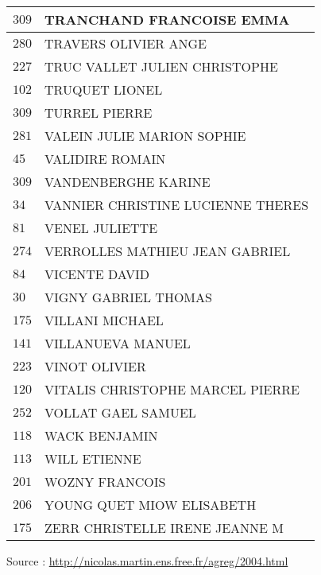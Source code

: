 \begin{xltabular}{\linewidth}{|l|X|}
    \hline
    $309$ & TRANCHAND FRANCOISE EMMA \\
    \hline
    $280$ & TRAVERS OLIVIER ANGE \\
    \hline
    $227$ & TRUC VALLET JULIEN CHRISTOPHE \\
    \hline
    $102$ & TRUQUET LIONEL \\
    \hline
    $309$ & TURREL PIERRE \\
    \hline
    $281$ & VALEIN JULIE MARION SOPHIE \\
    \hline
    $45$ & VALIDIRE ROMAIN \\
    \hline
    $309$ & VANDENBERGHE KARINE \\
    \hline
    $34$ & VANNIER CHRISTINE LUCIENNE THERES \\
    \hline
    $81$ & VENEL JULIETTE \\
    \hline
    $274$ & VERROLLES MATHIEU JEAN GABRIEL \\
    \hline
    $84$ & VICENTE DAVID \\
    \hline
    $30$ & VIGNY GABRIEL THOMAS \\
    \hline
    $175$ & VILLANI MICHAEL \\
    \hline
    $141$ & VILLANUEVA MANUEL \\
    \hline
    $223$ & VINOT OLIVIER \\
    \hline
    $120$ & VITALIS CHRISTOPHE MARCEL PIERRE \\
    \hline
    $252$ & VOLLAT GAEL SAMUEL \\
    \hline
    $118$ & WACK BENJAMIN \\
    \hline
    $113$ & WILL ETIENNE \\
    \hline
    $201$ & WOZNY FRANCOIS \\
    \hline
    $206$ & YOUNG QUET MIOW ELISABETH \\
    \hline
    $175$ & ZERR CHRISTELLE IRENE JEANNE M \\
    \hline
  \end{xltabular}

  \begin{flushright}
    {\tiny Source : \url{http://nicolas.martin.ens.free.fr/agreg/2004.html}}
  \end{flushright}

